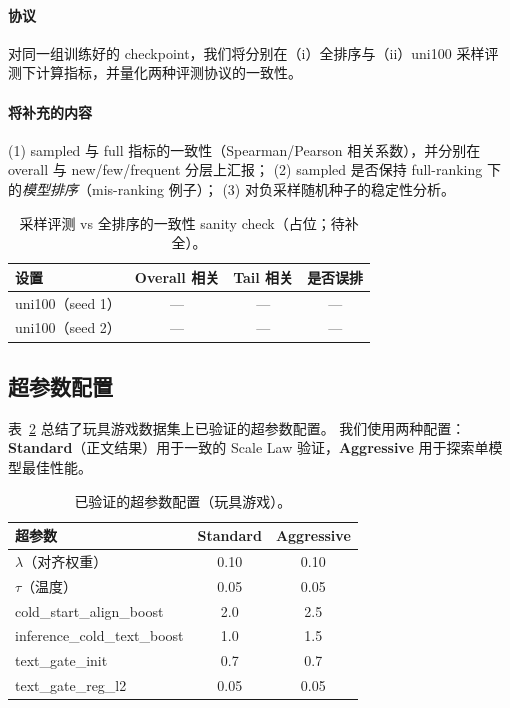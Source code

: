 \documentclass[sigconf,natbib=true]{acmart}
\begin{document}
\paragraph{协议}
对同一组训练好的 checkpoint，我们将分别在（i）全排序与（ii）uni100 采样评测下计算指标，并量化两种评测协议的一致性。
\paragraph{将补充的内容}
(1) sampled 与 full 指标的一致性（Spearman/Pearson 相关系数），并分别在 overall 与 new/few/frequent 分层上汇报；
(2) sampled 是否保持 full-ranking 下的\emph{模型排序}（mis-ranking 例子）；
(3) 对负采样随机种子的稳定性分析。
\begin{table}[t]
\caption{采样评测 vs 全排序的一致性 sanity check（占位；待补全）。}
\label{tab:sampled_sanity}
\centering
\small
\begin{tabular}{lccc}
\toprule
\textbf{设置} & \textbf{Overall 相关} & \textbf{Tail 相关} & \textbf{是否误排} \\
\midrule
uni100（seed 1） & --- & --- & --- \\
uni100（seed 2） & --- & --- & --- \\
\bottomrule
\end{tabular}
\end{table}

\subsection{超参数配置}
\label{app:hyper}
表~\ref{tab:hyper_config} 总结了玩具游戏数据集上已验证的超参数配置。
我们使用两种配置：\textbf{Standard}（正文结果）用于一致的 Scale Law 验证，\textbf{Aggressive} 用于探索单模型最佳性能。

\begin{table}[t]
\caption{已验证的超参数配置（玩具游戏）。}
\label{tab:hyper_config}
\centering
\small
\begin{tabular}{lcc}
\toprule
\textbf{超参数} & \textbf{Standard} & \textbf{Aggressive} \\
\midrule
$\lambda$（对齐权重） & 0.10 & 0.10 \\
$\tau$（温度） & 0.05 & 0.05 \\
cold\_start\_align\_boost & 2.0 & 2.5 \\
inference\_cold\_text\_boost & 1.0 & 1.5 \\
text\_gate\_init & 0.7 & 0.7 \\
text\_gate\_reg\_l2 & 0.05 & 0.05 \\
\bottomrule
\end{tabular}
\end{table}
\end{document}
